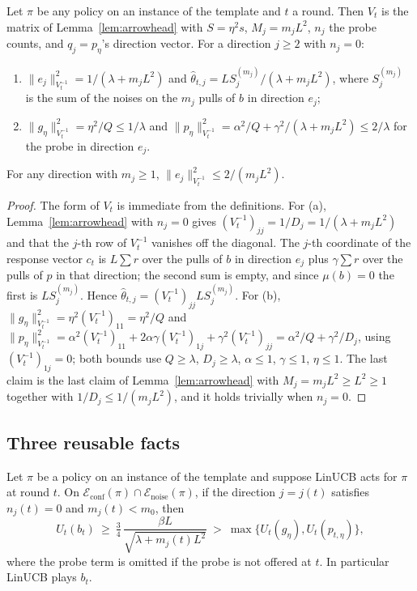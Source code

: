 \documentclass[anon]{alt2027} %
\begin{document}
\begin{lemma}
\label{lem:cat-state}
Let $\pi$ be any policy on an instance of the template and $t$ a round. Then
$V_t$ is the matrix of Lemma~\ref{lem:arrowhead} with $S=\eta^2s$, $M_j=m_jL^2$,
$n_j$ the probe counts, and $q_j=p_\eta$'s direction vector. For a direction
$j\ge2$ with $n_j=0$:
\begin{enumerate}[itemsep=1pt,topsep=1pt,leftmargin=*]
\item[(a)] $\|e_j\|^2_{V_t^{-1}}=1/(\lambda+m_jL^2)$ and
$\widehat\theta_{t,j}=LS_j^{(m_j)}/(\lambda+m_jL^2)$, where $S_j^{(m_j)}$ is the
sum of the noises on the $m_j$ pulls of $b$ in direction $e_j$;
\item[(b)] $\|g_\eta\|^2_{V_t^{-1}}=\eta^2/Q\le1/\lambda$ and
$\|p_\eta\|^2_{V_t^{-1}}=\alpha^2/Q+\gamma^2/(\lambda+m_jL^2)\le2/\lambda$ for the probe
in direction $e_j$.
\end{enumerate}
For any direction with $m_j\ge1$, $\|e_j\|^2_{V_t^{-1}}\le2/(m_jL^2)$.
\end{lemma}

\begin{proof}
The form of $V_t$ is immediate from the definitions. For (a), Lemma~\ref{lem:arrowhead}
with $n_j=0$ gives $(V_t^{-1})_{jj}=1/D_j=1/(\lambda+m_jL^2)$ and that the $j$-th
row of $V_t^{-1}$ vanishes off the diagonal. The $j$-th coordinate of the
response vector $c_t$ is $L\sum r$ over the pulls of $b$ in direction $e_j$
plus $\gamma\sum r$ over the pulls of $p$ in that direction; the second sum is
empty, and since $\mu(b)=0$ the first is $LS_j^{(m_j)}$. Hence
$\widehat\theta_{t,j}=(V_t^{-1})_{jj}LS_j^{(m_j)}$. For (b),
$\|g_\eta\|^2_{V_t^{-1}}=\eta^2(V_t^{-1})_{11}=\eta^2/Q$ and
$\|p_\eta\|^2_{V_t^{-1}}=\alpha^2(V_t^{-1})_{11}+2\alpha \gamma(V_t^{-1})_{1j}+\gamma^2(V_t^{-1})_{jj}
=\alpha^2/Q+\gamma^2/D_j$, using $(V_t^{-1})_{1j}=0$; both bounds use $Q\ge\lambda$,
$D_j\ge\lambda$, $\alpha\le1$, $\gamma\le1$, $\eta\le1$. The last claim is the last
claim of Lemma~\ref{lem:arrowhead} with $M_j=m_jL^2\ge L^2\ge1$ together with
$1/D_j\le1/(m_jL^2)$, and it holds trivially when $n_j=0$.
\end{proof}

\subsection{Three reusable facts}

\begin{lemma}
\label{lem:cat-trap}
Let $\pi$ be a policy on an instance of the template and suppose LinUCB acts
for $\pi$ at round $t$. On $\mathcal E_{\mathrm{conf}}(\pi)\cap\mathcal E_{\mathrm{noise}}(\pi)$,
if the direction $j=j(t)$ satisfies $n_j(t)=0$ and $m_j(t)<m_0$, then
\[
U_t(b_t)\ \ge\ \tfrac34\,\frac{\beta L}{\sqrt{\lambda+m_j(t)L^2}}\ >\ \max\{U_t(g_\eta),U_t(p_{t,\eta})\},
\]
where the probe term is omitted if the probe is not offered at $t$. In
particular LinUCB plays $b_t$.
\end{lemma}
\end{document}
